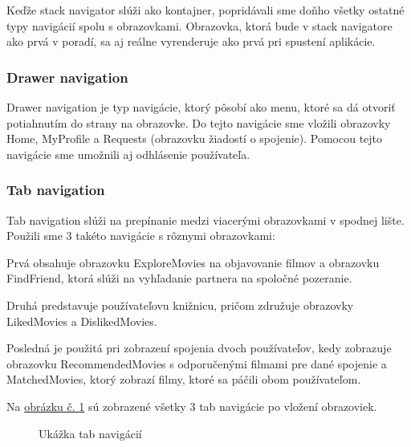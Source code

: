 Keďže stack navigator slúži ako kontajner, popridávali sme doňho všetky ostatné typy navigácií spolu s obrazovkami. Obrazovka, ktorá bude v stack navigatore ako prvá v poradí, sa aj reálne vyrenderuje ako prvá pri spustení aplikácie. 

\subsubsection{Drawer navigation}
Drawer navigation je typ navigácie, ktorý pôsobí ako menu, ktoré sa dá otvoriť potiahnutím do strany na obrazovke. Do tejto navigácie sme vložili obrazovky Home, MyProfile a Requests (obrazovku žiadostí o spojenie). Pomocou tejto navigácie sme umožnili aj odhlásenie používateľa.
\subsubsection{Tab navigation}
Tab navigation slúži na prepínanie medzi viacerými obrazovkami v spodnej lište. Použili sme 3 takéto navigácie s rôznymi obrazovkami: 
\begin{itemize}
{\item Prvá obsahuje obrazovku ExploreMovies na objavovanie filmov a obrazovku FindFriend, ktorá slúži na vyhľadanie partnera na spoločné pozeranie. } 
{\item Druhá predstavuje používateľovu knižnicu, pričom združuje obrazovky LikedMovies a DislikedMovies.} 
{\item Posledná je použitá pri zobrazení spojenia dvoch používateľov, kedy zobrazuje obrazovku RecommendedMovies s odporučenými filmami pre dané spojenie a MatchedMovies, ktorý zobrazí filmy, ktoré sa páčili obom používateľom.} 
\end{itemize}

Na \hyperref[tabnav]{obrázku č. \ref{tabnav}} sú zobrazené všetky 3 tab navigácie po vložení obrazoviek.

\begin{figure}[hbt!]
  \centering   
  \def\stackalignment{c}
           \scriptsize
	\caption{Ukážka tab navigácií}  
  \label{tabnav}
\end{figure}


